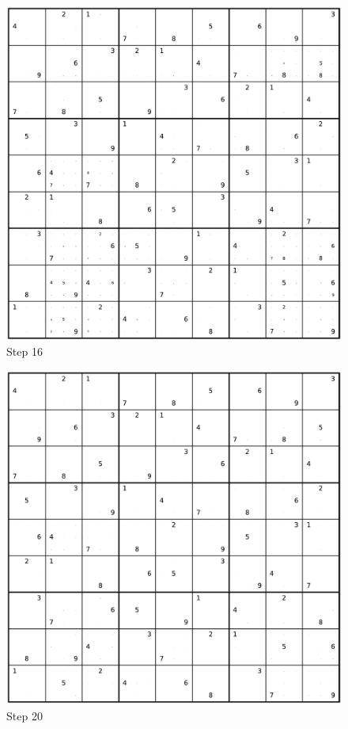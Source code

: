\begin{figure}
	\caption*{Step 16}
	\centering
	\includegraphics[width=1.0\textwidth]{figures/full/000-16.pdf}
\end{figure}

\begin{figure}
	\caption*{Step 20}
	\centering
	\includegraphics[width=1.0\textwidth]{figures/full/000-20.pdf}
\end{figure}
